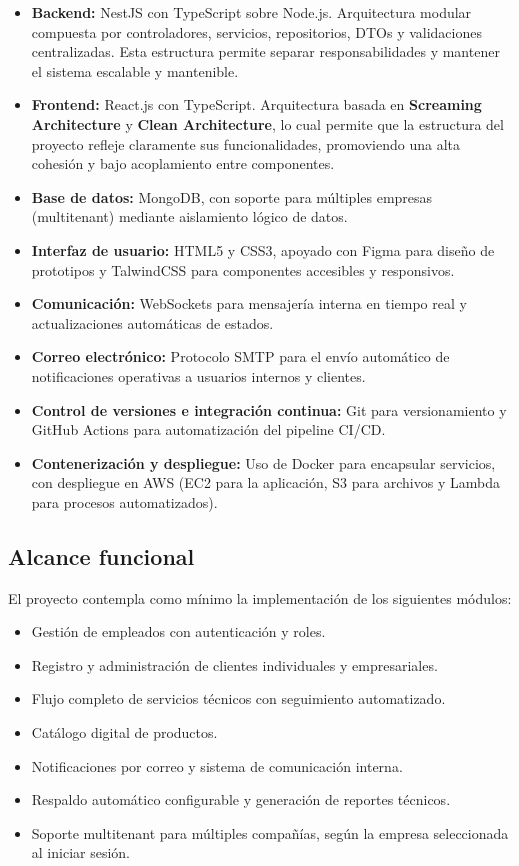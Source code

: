 \begin{itemize}
	\item \textbf{Backend:} NestJS con TypeScript sobre Node.js. Arquitectura modular compuesta por controladores, servicios, repositorios, DTOs y validaciones centralizadas. Esta estructura permite separar responsabilidades y mantener el sistema escalable y mantenible.
	\item \textbf{Frontend:} React.js con TypeScript. Arquitectura basada en \textbf{Screaming Architecture} y \textbf{Clean Architecture}, lo cual permite que la estructura del proyecto refleje claramente sus funcionalidades, promoviendo una alta cohesión y bajo acoplamiento entre componentes.
	\item \textbf{Base de datos:} MongoDB, con soporte para múltiples empresas (multitenant) mediante aislamiento lógico de datos.
	\item \textbf{Interfaz de usuario:} HTML5 y CSS3, apoyado con Figma para diseño de prototipos y TalwindCSS para componentes accesibles y responsivos.
	\item \textbf{Comunicación:} WebSockets para mensajería interna en tiempo real y actualizaciones automáticas de estados.
	\item \textbf{Correo electrónico:} Protocolo SMTP para el envío automático de notificaciones operativas a usuarios internos y clientes.
	\item \textbf{Control de versiones e integración continua:} Git para versionamiento y GitHub Actions para automatización del pipeline CI/CD.
	\item \textbf{Contenerización y despliegue:} Uso de Docker para encapsular servicios, con despliegue en AWS (EC2 para la aplicación, S3 para archivos y Lambda para procesos automatizados).
\end{itemize}


\subsection*{Alcance funcional}

El proyecto contempla como mínimo la implementación de los siguientes módulos:

\begin{itemize}
	\item Gestión de empleados con autenticación y roles.
	\item Registro y administración de clientes individuales y empresariales.
	\item Flujo completo de servicios técnicos con seguimiento automatizado.
	\item Catálogo digital de productos.
	\item Notificaciones por correo y sistema de comunicación interna.
	\item Respaldo automático configurable y generación de reportes técnicos.
	\item Soporte multitenant para múltiples compañías, según la empresa seleccionada al iniciar sesión.
\end{itemize}

